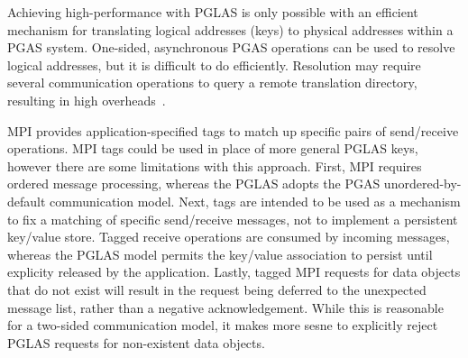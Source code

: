 

Achieving high-performance with PGLAS is only possible with an efficient
mechanism for translating logical addresses (keys) to physical addresses within
a PGAS system. One-sided, asynchronous PGAS operations can be used to resolve
logical addresses, but it is difficult to do efficiently. Resolution may
require several communication operations to query a remote translation 
directory, resulting in high overheads~\cite{namashivayam:15}.

MPI provides application-specified tags to match up specific pairs of 
send/receive operations. MPI tags could be used in place of more general PGLAS 
keys, however there are some limitations with this approach. First, MPI 
requires ordered message processing, whereas the PGLAS adopts the
PGAS unordered-by-default communication model. Next, tags are intended to be 
used as a mechanism to fix a matching of specific send/receive messages, not to 
implement a persistent key/value store. Tagged receive operations are consumed 
by incoming messages, whereas the PGLAS model permits the key/value association
to persist until explicity released by the application. Lastly, tagged MPI 
requests for data objects that do not exist will result in the request being 
deferred to the unexpected message list, rather than a negative 
acknowledgement. While this is reasonable for a two-sided communication model, 
it makes more sesne to explicitly reject PGLAS requests for non-existent data 
objects.

